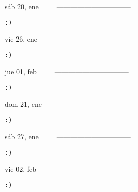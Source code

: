 \documentclass[letterpaper,10pt]{article}
\begin{document}
\begin{multicols}{3}
{sáb 20, ene\ \ \ \ \ --------------------------------}
\begin{flushright}\begin{small}\texttt{:)}\end{small}\end{flushright}
\vfill
{vie 26, ene\ \ \ \ \ --------------------------------}
\begin{flushright}\begin{small}\texttt{:)}\end{small}\end{flushright}\par
\vfill
{jue 01, feb\ \ \ \ \ --------------------------------}
\begin{flushright}\begin{small}\texttt{:)}\end{small}\end{flushright}\par
\vfill
\end{multicols}
\vspace{1.05cm}

\begin{multicols}{3}
{dom 21, ene\ \ \ \ \ --------------------------------}
\begin{flushright}\begin{small}\texttt{:)}\end{small}\end{flushright}
\vfill
{sáb 27, ene\ \ \ \ \ --------------------------------}
\begin{flushright}\begin{small}\texttt{:)}\end{small}\end{flushright}\par
\vfill
{vie 02, feb\ \ \ \ \ --------------------------------}
\begin{flushright}\begin{small}\texttt{:)}\end{small}\end{flushright}\par
\vfill
\end{multicols}
\vspace{1.05cm}
\end{document}
